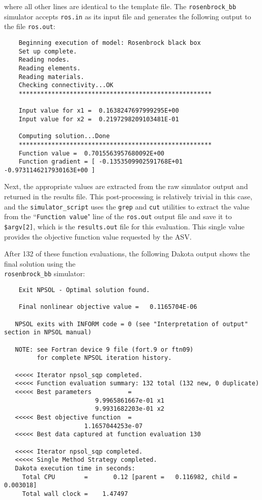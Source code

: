 where all other lines are identical to the template file. The
\texttt{rosenbrock\_bb} simulator accepts \texttt{ros.in} as its input
file and generates the following output to the file \texttt{ros.out}:
\begin{small}
\begin{verbatim}
    Beginning execution of model: Rosenbrock black box
    Set up complete.
    Reading nodes.
    Reading elements.
    Reading materials.
    Checking connectivity...OK
    *****************************************************

    Input value for x1 =  0.1638247697999295E+00
    Input value for x2 =  0.2197298209103481E-01

    Computing solution...Done
    *****************************************************
    Function value =  0.7015563957680092E+00
    Function gradient = [ -0.1353509902591768E+01 -0.9731146217930163E+00 ]
\end{verbatim}
\end{small}

Next, the appropriate values are extracted from the raw simulator output
and returned in the results file. This post-processing is relatively
trivial in this case, and the \texttt{simulator\_script} uses the
\texttt{grep} and \texttt{cut} utilities to extract the value from the
``\texttt{Function value}" line of the \texttt{ros.out} output file and save it to
\texttt{\$argv[2]}, which is the \texttt{results.out} file for this
evaluation. This single value provides the objective function value
requested by the ASV.

After 132 of these function evaluations, the following Dakota output
shows the final solution using the \\ \texttt{rosenbrock\_bb} simulator:
\begin{small}
\begin{verbatim}
    Exit NPSOL - Optimal solution found.

    Final nonlinear objective value =   0.1165704E-06

   NPSOL exits with INFORM code = 0 (see "Interpretation of output" section in NPSOL manual)

   NOTE: see Fortran device 9 file (fort.9 or ftn09)
         for complete NPSOL iteration history.

   <<<<< Iterator npsol_sqp completed.
   <<<<< Function evaluation summary: 132 total (132 new, 0 duplicate)
   <<<<< Best parameters          =
                         9.9965861667e-01 x1
                         9.9931682203e-01 x2
   <<<<< Best objective function  =
                      1.1657044253e-07
   <<<<< Best data captured at function evaluation 130

   <<<<< Iterator npsol_sqp completed.
   <<<<< Single Method Strategy completed.
   Dakota execution time in seconds:
     Total CPU        =       0.12 [parent =   0.116982, child =   0.003018]
     Total wall clock =    1.47497
\end{verbatim}
\end{small}

